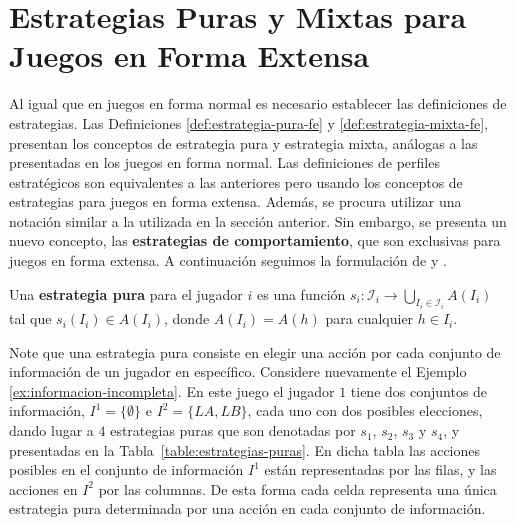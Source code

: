 \begin{figure}
\begin{center}
\end{center}
\end{figure}




\section{Estrategias Puras y Mixtas para Juegos en Forma Extensa}

Al igual que en juegos en forma normal es necesario establecer las definiciones de estrategias. Las Definiciones \ref{def:estrategia-pura-fe} y \ref{def:estrategia-mixta-fe}, presentan los conceptos de estrategia pura y estrategia mixta, análogas a las presentadas en los juegos en forma normal. Las definiciones de perfiles estratégicos son equivalentes a las anteriores pero usando los conceptos de estrategias para juegos en forma extensa. Además, se procura utilizar una notación similar a la utilizada en la sección anterior. Sin embargo, se presenta un nuevo concepto, las \textbf{estrategias de comportamiento}, que son exclusivas para juegos en forma extensa. A continuación seguimos la formulación de \cite{bib:conceptos-basicos} y \cite{bib:course-game-theory}.

\begin{definition}
\label{def:estrategia-pura-fe}
Una \textbf{estrategia pura} para el jugador $i$ es una función $s_i : \mathcal{I}_i \rightarrow \bigcup_{I_i \in \mathcal{I}_i}A(I_i)$ tal que $s_i(I_i) \in A(I_i)$, donde $A(I_i) = A(h)$ para cualquier $h \in I_i$. 
\end{definition}

Note que una estrategia pura consiste en elegir una acción por cada conjunto de información de un jugador en específico. Considere nuevamente el Ejemplo \ref{ex:informacion-incompleta}. En este juego el jugador $1$ tiene dos conjuntos de información, $I^1 = \{\emptyset\}$ e $I^2 = \{LA, LB\}$, cada uno con dos posibles elecciones, dando lugar a $4$ estrategias puras que son denotadas por $s_1$, $s_2$, $s_3$ y $s_4$, y presentadas en la Tabla~\ref{table:estrategias-puras}. En dicha tabla las acciones posibles en el conjunto de información $I^1$ están representadas por las filas, y las acciones en $I^2$ por las columnas. De esta forma cada celda representa una única estrategia pura determinada por una acción en cada conjunto de información.


